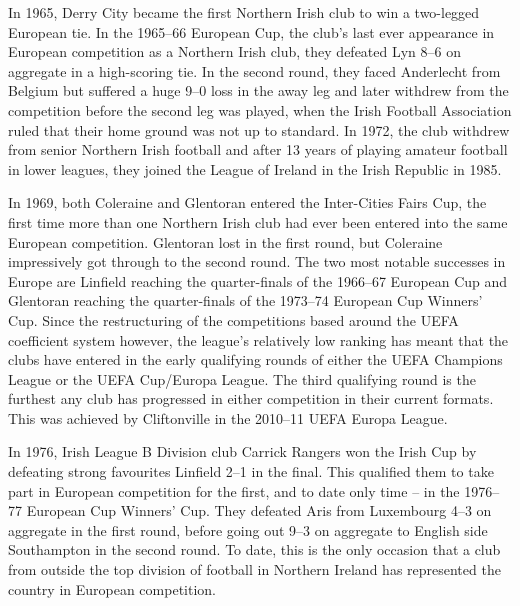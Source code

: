 In 1965, Derry City became the first Northern Irish club to win a
two-legged European tie. In the 1965--66 European Cup, the club's last
ever appearance in European competition as a Northern Irish club, they
defeated Lyn 8--6 on aggregate in a high-scoring tie. In the second
round, they faced Anderlecht from Belgium but suffered a huge 9--0 loss
in the away leg and later withdrew from the competition before the
second leg was played, when the Irish Football Association ruled that
their home ground was not up to standard. In 1972, the club withdrew
from senior Northern Irish football and after 13 years of playing
amateur football in lower leagues, they joined the League of Ireland in
the Irish Republic in 1985.

In 1969, both Coleraine and Glentoran entered the Inter-Cities Fairs
Cup, the first time more than one Northern Irish club had ever been
entered into the same European competition. Glentoran lost in the first
round, but Coleraine impressively got through to the second round. The
two most notable successes in Europe are Linfield reaching the
quarter-finals of the 1966--67 European Cup and Glentoran reaching the
quarter-finals of the 1973--74 European Cup Winners' Cup. Since the
restructuring of the competitions based around the UEFA coefficient
system however, the league's relatively low ranking has meant that the
clubs have entered in the early qualifying rounds of either the UEFA
Champions League or the UEFA Cup/Europa League. The third qualifying
round is the furthest any club has progressed in either competition in
their current formats. This was achieved by Cliftonville in the 2010--11
UEFA Europa League.

In 1976, Irish League B Division club Carrick Rangers won the Irish Cup
by defeating strong favourites Linfield 2--1 in the final. This
qualified them to take part in European competition for the first, and
to date only time -- in the 1976--77 European Cup Winners' Cup. They
defeated Aris from Luxembourg 4--3 on aggregate in the first round,
before going out 9--3 on aggregate to English side Southampton in the
second round. To date, this is the only occasion that a club from
outside the top division of football in Northern Ireland has represented
the country in European competition.

